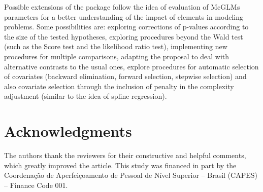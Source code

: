 \documentclass[article]{jss}\usepackage[]{graphicx}\usepackage[]{xcolor}
\begin{document}
Possible extensions of the  package follow the idea of evaluation of McGLMs parameters for a better understanding of the impact of elements in modeling problems. Some possibilities are: exploring corrections of p-values according to the size of the tested hypotheses, exploring procedures beyond the Wald test (such as the Score test and the likelihood ratio test), implementing new procedures for multiple comparisons, adapting the proposal to deal with alternative contrasts to the usual ones, explore procedures for automatic selection of covariates (backward elimination, forward selection, stepwise selection) and also covariate selection through the inclusion of penalty in the complexity adjustment (similar to the idea of spline regression).


\section*{Acknowledgments}

\begin{leftbar}
The authors thank the reviewers for their constructive and helpful comments, which greatly improved the article. This study was financed in part by the Coordenação de Aperfeiçoamento de Pessoal de Nível Superior – Brasil (CAPES) – Finance Code 001.
\end{leftbar}





\newpage




\end{document}
